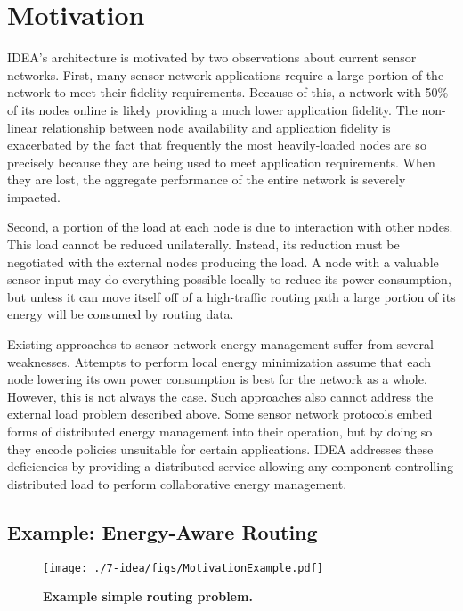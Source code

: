 \section{Motivation}
\label{idea-sec-motivation}

IDEA's architecture is motivated by two observations about current sensor
networks. First, many sensor network applications require a large portion of
the network to meet their fidelity requirements. Because of this, a network
with 50\% of its nodes online is likely providing a much lower application
fidelity. The non-linear relationship between node availability and
application fidelity is exacerbated by the fact that frequently the most
heavily-loaded nodes are so precisely because they are being used to meet
application requirements. When they are lost, the aggregate performance of
the entire network is severely impacted.

Second, a portion of the load at each node is due to interaction with other
nodes. This load cannot be reduced unilaterally. Instead, its reduction must
be negotiated with the external nodes producing the load. A node with a
valuable sensor input may do everything possible locally to reduce its power
consumption, but unless it can move itself off of a high-traffic routing path
a large portion of its energy will be consumed by routing data.  

Existing approaches to sensor network energy management suffer from several
weaknesses. Attempts to perform local energy minimization assume that each
node lowering its own power consumption is best for the network as a whole.
However, this is not always the case. Such approaches also cannot address
the external load problem described above. Some sensor network
protocols embed forms of distributed energy management into their operation,
but by doing so they encode policies unsuitable for certain
applications. IDEA addresses these deficiencies by providing a distributed
service allowing any component controlling distributed load to perform
collaborative energy management.

\subsection{Example: Energy-Aware Routing}

\begin{figure}[t]
\label{idea-fig-motivationexample}
\begin{center}
\texttt{[image: ./7-idea/figs/MotivationExample.pdf]}
\end{center}
\caption{\textbf{Example simple routing problem.}}
\end{figure}

